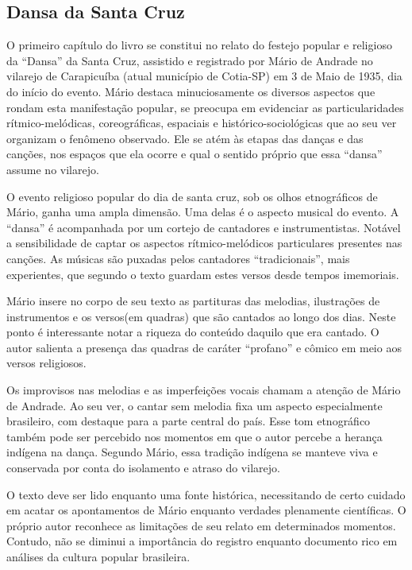 \subsection{Dansa da Santa Cruz}

O primeiro capítulo do livro se constitui no relato do festejo popular e
religioso da ``Dansa'' da Santa Cruz, assistido e registrado por Mário
de Andrade no vilarejo de Carapicuíba (atual município de Cotia-SP) em 3
de Maio de 1935, dia do início do evento. Mário destaca minuciosamente
os diversos aspectos que rondam esta manifestação popular, se preocupa
em evidenciar as particularidades rítmico-melódicas, coreográficas,
espaciais e histórico-sociológicas que ao seu ver organizam o fenômeno
observado. Ele se atém às etapas das danças e das canções, nos espaços
que ela ocorre e qual o sentido próprio que essa ``dansa'' assume no
vilarejo.

O evento religioso popular do dia de santa cruz, sob os olhos
etnográficos de Mário, ganha uma ampla dimensão. Uma delas é o aspecto
musical do evento. A ``dansa'' é acompanhada por um cortejo de
cantadores e instrumentistas. Notável a sensibilidade de captar os
aspectos rítmico-melódicos particulares presentes nas canções. As
músicas são puxadas pelos cantadores ``tradicionais'', mais experientes,
que segundo o texto guardam estes versos desde tempos imemoriais.

Mário insere no corpo de seu texto as partituras das melodias,
ilustrações de instrumentos e os versos(em quadras) que são cantados ao
longo dos dias. Neste ponto é interessante notar a riqueza do conteúdo
daquilo que era cantado. O autor salienta a presença das quadras de
caráter ``profano'' e cômico em meio aos versos religiosos.

Os improvisos nas melodias e as imperfeições vocais chamam a atenção de
Mário de Andrade. Ao seu ver, o cantar sem melodia fixa um aspecto
especialmente brasileiro, com destaque para a parte central do país.
Esse tom etnográfico também pode ser percebido
nos momentos em que o autor percebe a herança indígena na dança.
Segundo Mário, essa tradição indígena se manteve viva e conservada por
conta do isolamento e atraso do vilarejo.

O texto deve ser lido enquanto uma fonte histórica, necessitando de
certo cuidado em acatar os apontamentos de Mário enquanto verdades
plenamente científicas. O próprio autor reconhece as limitações de seu
relato em determinados momentos. Contudo, não se diminui a importância
do registro enquanto documento rico em análises da cultura popular
brasileira.

